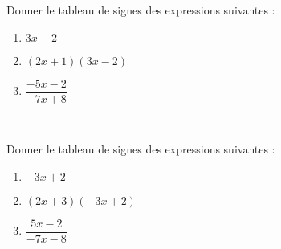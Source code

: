\documentclass[a4paper,12pt,french]{article}
\begin{document}


Donner le tableau de signes des expressions suivantes :
\begin{multicols}{3}
	\begin{enumerate}[\bfseries 1.]
		\item 	$3x-2$
		\item 	$(2x+1)(3x-2)$
		\item	$\dfrac{-5x-2}{-7x+8}$
	\end{enumerate}
\end{multicols}\ \\[-2em]




Donner le tableau de signes des expressions suivantes :
\begin{multicols}{3}
	\begin{enumerate}[\bfseries 1.]
		\item 	$-3x+2$
		\item 	$(2x+3)(-3x+2)$
		\item	$\dfrac{5x-2}{-7x-8}$
	\end{enumerate}
\end{multicols}\ \\[-2em]

\end{document}
